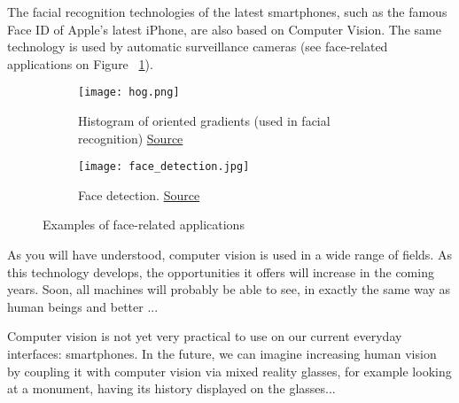The facial recognition technologies of the latest smartphones, such as the famous Face ID of Apple's latest iPhone, are also based on Computer Vision. The same technology is used by automatic surveillance cameras (see face-related applications on Figure ~\ref{fig:facreco}).
\begin{figure}[H]
\centering
\begin{subfigure}{.5\textwidth}
  \centering
  \texttt{[image: hog.png]}
  \caption{Histogram of oriented gradients (used in facial recognition) \href{https://medium.com/@ageitgey/machine-learning-is-fun-part-4-modern-face-recognition-with-deep-learning-c3cffc121d78}{Source}}
\end{subfigure}%
\begin{subfigure}{.5\textwidth}
  \centering
  \texttt{[image: face\_detection.jpg]}
  \caption{Face detection. \href{https://towardsdatascience.com/learning-computer-vision-41398ad9941f}{Source}}
\end{subfigure}
\caption{Examples of face-related applications}
\label{fig:facreco}
\end{figure}

As you will have understood, computer vision is used in a wide range of fields. As this technology develops, the opportunities it offers will increase in the coming years. Soon, all machines will probably be able to see, in exactly the same way as human beings and better ...

Computer vision is not yet very practical to use on our current everyday interfaces: smartphones.
In the future, we can imagine increasing human vision by coupling it with computer vision via mixed reality glasses, for example looking at a monument, having its history displayed on the glasses...